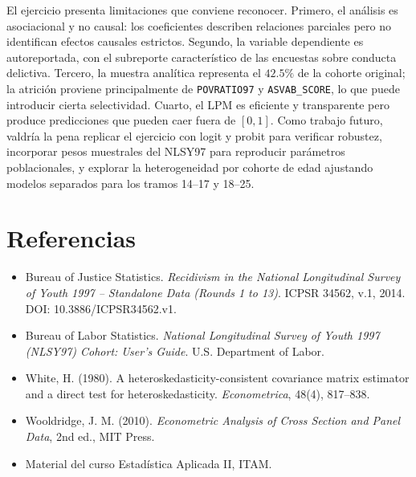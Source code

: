 \documentclass[11pt]{article}
\begin{document}
El ejercicio presenta limitaciones que conviene reconocer. Primero, el análisis es asociacional y no causal: los coeficientes describen relaciones parciales pero no identifican efectos causales estrictos. Segundo, la variable dependiente es autoreportada, con el subreporte característico de las encuestas sobre conducta delictiva. Tercero, la muestra analítica representa el $42.5\%$ de la cohorte original; la atrición proviene principalmente de \texttt{POVRATIO97} y \texttt{ASVAB\_SCORE}, lo que puede introducir cierta selectividad. Cuarto, el LPM es eficiente y transparente pero produce predicciones que pueden caer fuera de $[0,1]$. Como trabajo futuro, valdría la pena replicar el ejercicio con logit y probit para verificar robustez, incorporar pesos muestrales del NLSY97 para reproducir parámetros poblacionales, y explorar la heterogeneidad por cohorte de edad ajustando modelos separados para los tramos 14--17 y 18--25.

\section{Referencias}
\begin{itemize}
\item Bureau of Justice Statistics. \textit{Recidivism in the National Longitudinal Survey of Youth 1997 -- Standalone Data (Rounds 1 to 13)}. ICPSR 34562, v.1, 2014. DOI: 10.3886/ICPSR34562.v1.
\item Bureau of Labor Statistics. \textit{National Longitudinal Survey of Youth 1997 (NLSY97) Cohort: User's Guide}. U.S. Department of Labor.
\item White, H. (1980). A heteroskedasticity-consistent covariance matrix estimator and a direct test for heteroskedasticity. \textit{Econometrica}, 48(4), 817--838.
\item Wooldridge, J. M. (2010). \textit{Econometric Analysis of Cross Section and Panel Data}, 2nd ed., MIT Press.
\item Material del curso Estadística Aplicada II, ITAM.
\end{itemize}
\end{document}
